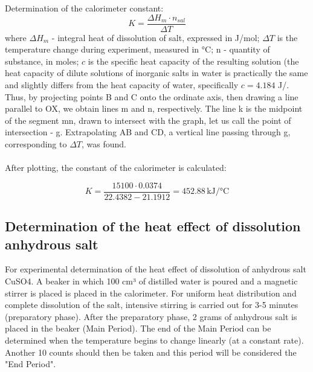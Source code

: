 \documentclass[12pt, letterpaper]{article}
\begin{document}
        
     Determination of the calorimeter constant:
    \begin{equation}
       K = \frac{\Delta H_m \cdot n_{sal}}{ \Delta T}
    \end{equation}
        \hspace{4mm} where $\Delta H_m$ - integral heat of dissolution of salt, expressed in J/mol; $\Delta T$ is the temperature change during experiment, measured in °C; n - quantity of substance, in moles; $c$ is the specific heat capacity of the resulting solution
        (the heat capacity of dilute solutions of inorganic salts in water is practically the same and slightly differs from the heat capacity of water, specifically $c = 4.184$ J/. \\ 
        Thus, by projecting points B and C onto the ordinate axis, then drawing a line parallel to OX, we obtain lines m and n, respectively. The line k is the midpoint of the segment mn, drawn to intersect with the graph, let us call the point of intersection - g. Extrapolating AB and CD, a vertical line passing through g, corresponding to $\Delta T$, was found. \\  \\     
        After plotting, the constant of the calorimeter is calculated:
    
    \begin{equation}
        K = \frac{15100 \cdot 0.0374}{22.4382 - 21.1912} = 452.88 \, \text{kJ/°C}
    \end{equation}



        
        \subsection*{Determination of the heat effect of dissolution
anhydrous salt}
        \hspace{4mm} For experimental determination of the heat effect of dissolution of anhydrous salt CuSO4. A beaker in which 100 cm³ of distilled water is poured and a magnetic stirrer is placed is placed in the calorimeter. For uniform heat distribution and complete dissolution of the salt, intensive stirring is carried out for 3-5 minutes (preparatory phase). After the preparatory phase, 2 grams of anhydrous salt is placed in the beaker (Main Period). The end of the Main Period can be determined when the temperature begins to change linearly (at a constant rate). Another 10 counts should then be taken and this period will be considered the "End Period".
        
\end{document}
